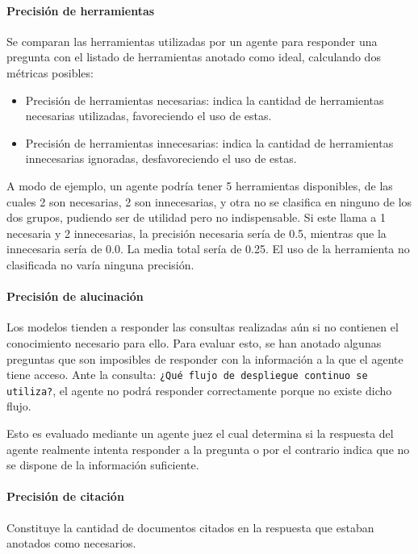\paragraph{Precisión de herramientas} Se comparan las herramientas utilizadas por un agente para responder una pregunta con el listado de herramientas anotado como ideal, calculando dos métricas posibles:

\begin{itemize}
\item Precisión de herramientas necesarias: indica la cantidad de herramientas necesarias utilizadas, favoreciendo el uso de estas.
\item Precisión de herramientas innecesarias: indica la cantidad de herramientas innecesarias ignoradas, desfavoreciendo el uso de estas.
\end{itemize}

A modo de ejemplo, un agente podría tener 5 herramientas disponibles, de las cuales 2 son necesarias, 2 son innecesarias, y otra no se clasifica en ninguno de los dos grupos, pudiendo ser de utilidad pero no indispensable. Si este llama a 1 necesaria y 2 innecesarias, la precisión necesaria sería de 0.5, mientras que la innecesaria sería de 0.0. La media total sería de 0.25. El uso de la herramienta no clasificada no varía ninguna precisión.

\paragraph{Precisión de alucinación} Los modelos tienden a responder las consultas realizadas aún si no contienen el conocimiento necesario para ello. Para evaluar esto, se han anotado algunas preguntas que son imposibles de responder con la información a la que el agente tiene acceso. Ante la consulta: \texttt{¿Qué flujo de despliegue continuo se utiliza?}, el agente no podrá responder correctamente porque no existe dicho flujo.

Esto es evaluado mediante un agente juez el cual determina si la respuesta del agente realmente intenta responder a la pregunta o por el contrario indica que no se dispone de la información suficiente.

\paragraph{Precisión de citación} Constituye la cantidad de documentos citados en la respuesta que estaban anotados como necesarios.



